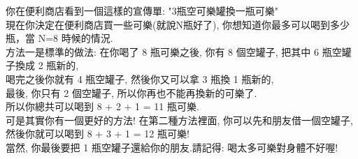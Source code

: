 你在便利商店看到一個這樣的宣傳單: "3瓶空可樂罐換一瓶可樂"\\
現在你決定在便利商店買一些可樂(就說N瓶好了), 你想知道你最多可以喝到多少瓶，當 N=8 時候的情況. \\
方法一是標準的做法: 在你喝了 8 瓶可樂之後, 你有 8 個空罐子, 把其中 6 瓶空罐子換成 2 瓶新的,\\
喝完之後你就有 4 瓶空罐子, 然後你又可以拿 3 瓶換 1 瓶新的, \\
最後, 你只有 2 個空罐子, 所以你再也不能再換新的可樂了. \\
所以你總共可以喝到 8 + 2 + 1 = 11 瓶可樂.\\
可是其實你有一個更好的方法! 在第二種方法裡面, 你可以先和朋友借一個空罐子, \\
然後你就可以喝到 8 + 3 + 1 = 12 瓶可樂!\\
當然, 你最後要把 1 瓶空罐子還給你的朋友.請記得: 喝太多可樂對身體不好喔!